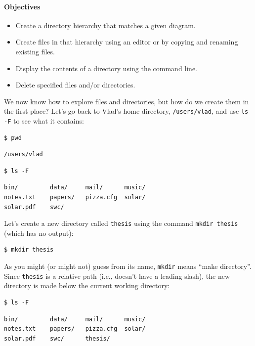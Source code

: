 \documentclass[]{book}
\begin{document}
\mbox{}\paragraph{Objectives}

\begin{itemize}
\item
  Create a directory hierarchy that matches a given diagram.
\item
  Create files in that hierarchy using an editor or by copying and
  renaming existing files.
\item
  Display the contents of a directory using the command line.
\item
  Delete specified files and/or directories.
\end{itemize}

We now know how to explore files and directories, but how do we create
them in the first place? Let's go back to Vlad's home directory,
\texttt{/users/vlad}, and use \texttt{ls -F} to see what it contains:

\begin{verbatim}
$ pwd
\end{verbatim}

\begin{verbatim}
/users/vlad
\end{verbatim}

\begin{verbatim}
$ ls -F
\end{verbatim}

\begin{verbatim}
bin/         data/     mail/      music/
notes.txt    papers/   pizza.cfg  solar/
solar.pdf    swc/
\end{verbatim}

Let's create a new directory called \texttt{thesis} using the command
\texttt{mkdir thesis} (which has no output):

\begin{verbatim}
$ mkdir thesis
\end{verbatim}

As you might (or might not) guess from its name, \texttt{mkdir} means
``make directory''. Since \texttt{thesis} is a relative path (i.e.,
doesn't have a leading slash), the new directory is made below the
current working directory:

\begin{verbatim}
$ ls -F
\end{verbatim}

\begin{verbatim}
bin/         data/     mail/      music/
notes.txt    papers/   pizza.cfg  solar/
solar.pdf    swc/      thesis/
\end{verbatim}
\end{document}
